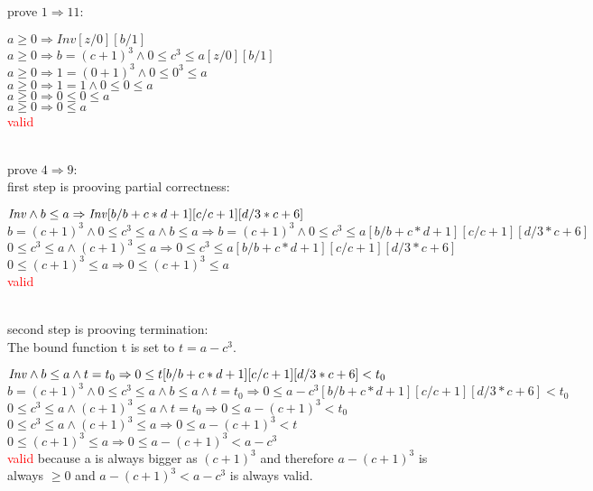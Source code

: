 \documentclass[a4paper]{scrartcl}
\begin{document}
prove $1 \Rightarrow 11$:\\
\begin{center}
$a \geq 0 \Rightarrow Inv[z/0][b/1]$\\
$a \geq 0 \Rightarrow b=(c+1)^3\land 0\leq c^3\leq a[z/0][b/1] $\\
$a \geq 0 \Rightarrow 1=(0+1)^3\land 0\leq 0^3\leq a$\\
$a \geq 0 \Rightarrow 1=1 \land 0\leq 0 \leq a$\\
$a \geq 0 \Rightarrow 0 \leq 0 \leq a$\\
$a \geq 0 \Rightarrow 0 \leq a$\\
\textcolor{red}{valid}\\
\end{center} 
\\

prove $4 \Rightarrow 9$:\\
first step is prooving partial correctness:\\
\begin{center}
$\mathit{Inv} \wedge b\leq a \Rightarrow \mathit{Inv}[b/b+c*d+1][c/c+1][d/3*c+6]$\\
$b=(c+1)^3\land 0\leq c^3\leq a \wedge b\leq a \Rightarrow b=(c+1)^3\land 0\leq c^3\leq a[b/b+c*d+1][c/c+1][d/3*c+6]$\\
$0\leq c^3\leq a \wedge (c+1)^3\leq a \Rightarrow 0\leq c^3\leq a[b/b+c*d+1][c/c+1][d/3*c+6]$\\
$0\leq (c+1)^3\leq a \Rightarrow 0\leq (c+1)^3\leq a$\\
\textcolor{red}{valid}\\
\end{center} 
\\
second step is prooving termination:\\
The bound function t is set to $t = a - c^3$.\\
\begin{center}
$\mathit{Inv} \wedge b\leq a \wedge t = t_0 \Rightarrow 0 \leq t[b/b+c*d+1][c/c+1][d/3*c+6] < t_0$\\
$b=(c+1)^3\land 0\leq c^3\leq a \wedge b\leq a \wedge t = t_0 \Rightarrow 0 \leq a - c^3[b/b+c*d+1][c/c+1][d/3*c+6] < t_0$\\
$0\leq c^3\leq a \wedge (c+1)^3 \leq a \wedge t = t_0 \Rightarrow 0 \leq a - (c+1)^3 < t_0$\\
$0\leq c^3\leq a \wedge (c+1)^3 \leq a \Rightarrow 0 \leq a - (c+1)^3 < t$\\
$0\leq (c+1)^3 \leq a \Rightarrow 0 \leq a - (c+1)^3 < a - c^3$\\
\textcolor{red}{valid} because a is always bigger as $(c+1)^3$ and therefore $a - (c+1)^3$ is always $\geq 0$ and $a - (c+1)^3 < a - c^3$ is always valid.\\
\end{center} 
\end{document}
